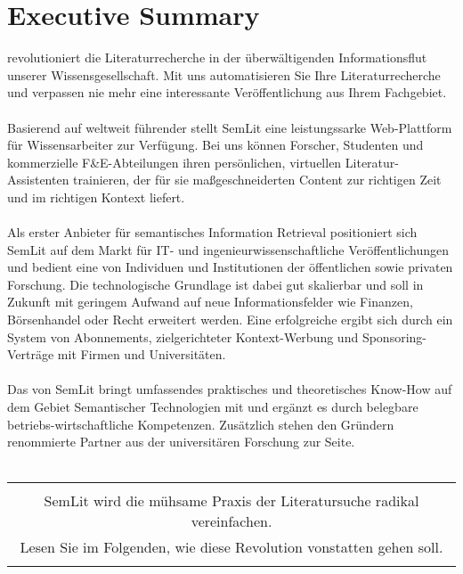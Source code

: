 \section{Executive Summary}

\textsc{\color{orange}{SemLit}} revolutioniert die Literaturrecherche in der überwältigenden Informationsflut unserer Wissensgesellschaft. Mit uns automatisieren Sie Ihre Literaturrecherche und verpassen nie mehr eine interessante Veröffentlichung aus Ihrem Fachgebiet. 
\\
\\
Basierend auf weltweit führender {\color{orange}{Semantischer Technologie}} stellt SemLit eine leistungssarke Web-Plattform für Wissensarbeiter zur Verfügung. Bei uns können Forscher, Studenten und kommerzielle F\&E-Abteilungen ihren persönlichen, virtuellen Literatur-Assistenten trainieren, der für sie maßgeschneiderten Content zur richtigen Zeit und im richtigen Kontext liefert. 
\\
\\
Als erster Anbieter für semantisches Information Retrieval positioniert sich SemLit auf dem Markt für IT- und ingenieurwissenschaftliche Veröffentlichungen und bedient eine {\color{orange}{stark wachsende Zielgruppe}} von Individuen und Institutionen der öffentlichen sowie privaten Forschung. Die technologische Grundlage ist dabei gut skalierbar und soll in Zukunft mit geringem Aufwand auf neue Informationsfelder wie Finanzen, Börsenhandel oder Recht erweitert werden. Eine erfolgreiche {\color{orange}{Monetarisierung}} ergibt sich durch ein System von Abonnements, zielgerichteter Kontext-Werbung und Sponsoring-Verträge mit Firmen und Universitäten. 
\\
\\
Das {\color{orange}{Gründerteam}} von SemLit bringt umfassendes praktisches und theoretisches Know-How auf dem Gebiet Semantischer Technologien mit und ergänzt es durch belegbare  betriebs-wirtschaftliche Kompetenzen. Zusätzlich stehen den Gründern renommierte Partner aus der universitären Forschung zur Seite.
\\
\\
\begin{table}[h!]
  \centering
  \begin{large}
	\begin{itshape}
  \begin{tabular}{c}\hline
  \\
  {\color{orange}SemLit wird die mühsame Praxis der Literatursuche radikal vereinfachen.}\\
  {\color{orange}Lesen Sie im Folgenden, wie diese Revolution vonstatten gehen soll.}\\
  \\\hline
  \end{tabular}
 	\end{itshape}
  \end{large}
\end{table}
